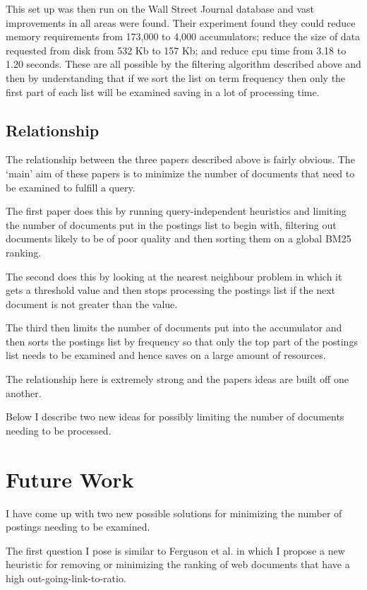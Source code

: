 \documentclass{acm_proc_article-sp}
\begin{document}
This set up was then run on the Wall Street Journal database and vast improvements in all areas were found. Their experiment found they could reduce memory requirements from 173,000 to 4,000 accumulators; reduce the size of data requested from disk from 532 Kb to 157 Kb; and reduce cpu time from 3.18 to 1.20 seconds. These are all possible by the filtering algorithm described above and then by understanding that if we sort the list on term frequency then only the first part of each list will be examined saving in a lot of processing time.

\subsection{Relationship}

The relationship between the three papers described above is fairly obvious. The `main' aim of these papers is to minimize the number of documents that need to be examined to fulfill a query. 

The first paper does this by running query-independent heuristics and limiting the number of documents put in the postings list to begin with, filtering out documents likely to be of poor quality and then sorting them on a global BM25 ranking.

The second does this by looking at the nearest neighbour problem in which it gets a threshold value and then stops processing the postings list if the next document is not greater than the value.

The third then limits the number of documents put into the accumulator and then sorts the postings list by frequency so that only the top part of the postings list needs to be examined and hence saves on a large amount of resources.

The relationship here is extremely strong and the papers ideas are built off one another.

Below I describe two new ideas for possibly limiting the number of documents needing to be processed.

\section{Future Work}
I have come up with two new possible solutions for minimizing the number of postings needing to be examined. 

The first question I pose is similar to Ferguson et al. in which I propose a new heuristic for removing or minimizing the ranking of web documents that have a high out-going-link-to-ratio. 
\end{document}
